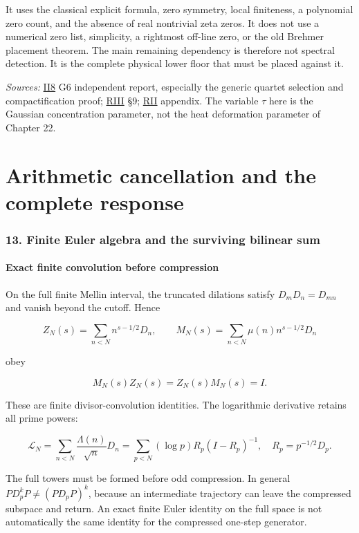 \documentclass[
  10pt,
  a4paper,
  10pt,
  oneside,
  openany]{book}
\begin{document}
It uses the classical explicit formula, zero symmetry, local finiteness,
a polynomial zero count, and the absence of real nontrivial zeta zeros.
It does not use a numerical zero list, simplicity, a rightmost off-line
zero, or the old Brehmer placement theorem. The main remaining
dependency is therefore not spectral detection. It is the complete
physical lower floor that must be placed against it.

\emph{Sources:} \hyperref[source-ii8]{II8} G6 independent report,
especially the generic quartet selection and compactification proof;
\hyperref[source-riii]{RIII} §9; \hyperref[source-rii]{RII} appendix.
The variable \(\tau\) here is the Gaussian concentration parameter, not
the heat deformation parameter of Chapter 22.

\part{Arithmetic cancellation and the complete response}

\section{13. Finite Euler algebra and the surviving bilinear
sum}\label{ch-euler}

\subsection{Exact finite convolution before
compression}\label{exact-finite-convolution-before-compression}

On the full finite Mellin interval, the truncated dilations satisfy
\(D_mD_n=D_{mn}\) and vanish beyond the cutoff. Hence

\[
Z_N(s)=\sum_{n<N}n^{s-1/2}D_n,
\qquad M_N(s)=\sum_{n<N}\mu(n)n^{s-1/2}D_n
\tag{13.1}\label{eq:13.1}
\]

obey

\[
M_N(s)Z_N(s)=Z_N(s)M_N(s)=I.
\tag{13.2}\label{eq:13.2}
\]

These are finite divisor-convolution identities. The logarithmic
derivative retains all prime powers:

\[
\mathcal L_N=\sum_{n<N}\frac{\Lambda(n)}{\sqrt n}D_n
=\sum_{p<N}(\log p)R_p(I-R_p)^{-1},
\quad R_p=p^{-1/2}D_p.
\tag{13.3}\label{eq:13.3}
\]

The full towers must be formed before odd compression. In general
\(PD_p^kP\ne(PD_pP)^k\), because an intermediate trajectory can leave
the compressed subspace and return. An exact finite Euler identity on
the full space is not automatically the same identity for the compressed
one-step generator.
\end{document}

